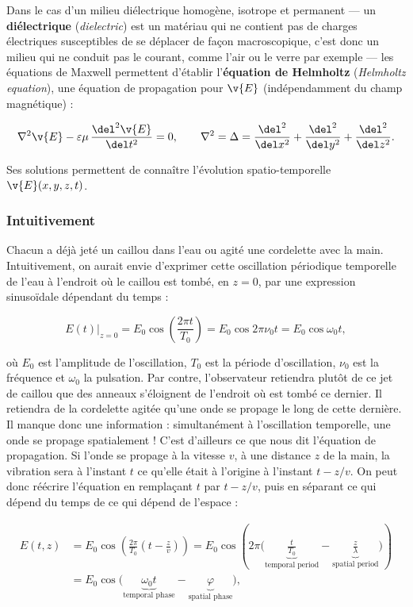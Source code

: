 Dans le cas d'un milieu diélectrique homogène, isotrope et permanent --- un
\textbf{diélectrique} (\textit{dielectric}) est un matériau qui ne contient pas
de charges électriques susceptibles de se déplacer de façon macroscopique, c'est
donc un milieu qui ne conduit pas le courant, comme l'air ou le verre par
exemple --- les équations de Maxwell permettent d'établir
l'\textbf{équation de Helmholtz} (\textit{Helmholtz equation}), une équation de
propagation pour $\v{E}$ (indépendamment du champ magnétique) :

\[
  \nabla^2\v{E}-\varepsilon\mu\,\frac{\del^2\v{E}}{\del t^2}=0,
  \qquad
  \nabla^2=\Delta=\frac{\del^2}{\del x^2}+\frac{\del^2}{\del y^2}+\frac{\del^2}{\del z^2}.
\]

Ses solutions permettent de connaître l'évolution spatio-temporelle
$\v{E}(x,y,z,t)$.

\subsubsection{Intuitivement}

Chacun a déjà jeté un caillou dans l'eau ou agité une cordelette avec la main.
Intuitivement, on aurait envie d'exprimer cette oscillation périodique
temporelle de l'eau à l'endroit où le caillou est tombé, en $z=0$, par une
expression sinusoïdale dépendant du temps :

\[
  E(t)\big|_{z=0}=E_0\cos\!\left(\frac{2\pi t}{T_0}\right)=E_0\cos 2\pi\nu_0 t=E_0\cos\omega_0 t,
\]

où $E_0$ est l'amplitude de l'oscillation, $T_0$ est la période d'oscillation,
$\nu_0$ est la fréquence et $\omega_0$ la pulsation. Par contre, l'observateur
retiendra plutôt de ce jet de caillou que des anneaux s'éloignent de l'endroit où
est tombé ce dernier. Il retiendra de la cordelette agitée qu'une onde se propage
le long de cette dernière. Il manque donc une information : simultanément à
l'oscillation temporelle, une onde se propage spatialement ! C'est d'ailleurs ce
que nous dit l'équation de propagation. Si l'onde se propage à la vitesse $v$, à
une distance $z$ de la main, la vibration sera à l'instant $t$ ce qu'elle était
à l'origine à l'instant $t-z/v$. On peut donc réécrire l'équation en remplaçant
$t$ par $t-z/v$, puis en séparant ce qui dépend du temps de ce qui dépend de
l'espace :

\begin{align*}
  E(t,z)&=E_0\cos\!\left(\frac{2\pi}{T_0}\left(t-\frac{z}{v}\right)\right)
  =E_0\cos\!\left(2\pi\Big(\underbrace{\tfrac{t}{T_0}}_{\text{temporal period}}
    -\underbrace{\tfrac{z}{\lambda}}_{\text{spatial period}}\Big)\right)\\
  &=E_0\cos\big(\underbrace{\omega_0t}_{\text{temporal phase}}
    -\underbrace{\varphi}_{\text{spatial phase}}\big),
\end{align*}

